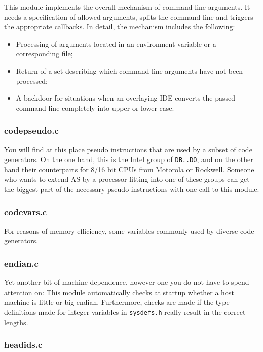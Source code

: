 \documentclass[12pt,twoside]{report}
\newcommand{\tty}[1]{{\tt #1}}
\newcommand{\asname}{{AS}}
\begin{document}
This module implements the overall mechanism of command line arguments.
It needs a specification of allowed arguments, splits the command line and
triggers the appropriate callbacks.   In detail, the mechanism includes
the following:
\begin{itemize}
\item{Processing of arguments located in an environment variable or
      a corresponding file;}
\item{Return of a set describing which command line arguments have not
      been processed;}
\item{A backdoor for situations when an overlaying IDE converts the passed
      command line completely into upper or lower case.}
\end{itemize}

\subsubsection{codepseudo.c}

You will find at this place pseudo instructions that are used by
a subset of code generators.  On the one hand, this is the Intel group of
\tty{DB..DO}, and on the other hand their counterparts for 8/16 bit CPUs
from Motorola or Rockwell.  Someone who wants to extend \asname{} by a
processor fitting into one of these groups can get the biggest part
of the necessary pseudo instructions with one call to this module.

\subsubsection{codevars.c}

For reasons of memory efficiency, some variables commonly used by diverse
code generators.

\subsubsection{endian.c}

Yet another bit of machine dependence, however one you do not have to
spend attention on: This module automatically checks at startup whether
a host machine is little or big endian.  Furthermore, checks are made if
the type definitions made for integer variables in {\tt sysdefs.h} really
result in the correct lengths.

\subsubsection{headids.c}
\end{document}
